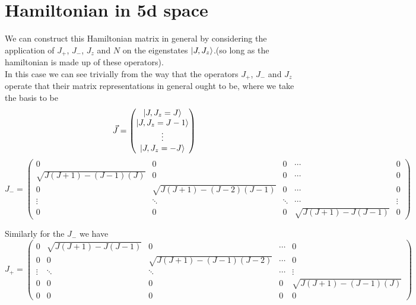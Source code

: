 \documentclass[11pt]{article} %
\begin{document}
\section{Hamiltonian in 5d space}

We can construct this Hamiltonian matrix in general by considering the application of $J_+$, $J_-$, $J_z$ and $N$ on the eigenstates $\ket{J,J_z}$.(so long as the hamiltonian is made up of these operators).\\


In this case we can see trivially from the way that the operators $J_+$, $J_-$ and $J_z$ operate that their matrix representations in general ought to be, where we take the basis to be \\
\begin{equation}
\vec{J}=\begin{pmatrix} \ket{J,J_z=J} \\ \ket{J,J_z=J-1} \\ \vdots \\ \ket{J,J_z=-J} \end{pmatrix}\end{equation}
\begin{equation}
J_-=\begin{pmatrix} 0 & 0 & 0 & \cdots & 0 \\
\sqrt{J(J+1)-(J-1)(J)} & 0 & 0 & \cdots & 0 \\
0& \sqrt{J(J+1)-(J-2)(J-1)}  & 0 & \cdots & 0 \\
\vdots & \ddots  & \ddots  & \cdots & \vdots\\
0 & 0 & 0 & \sqrt{J(J+1)-J(J-1)}& 0 

 \end{pmatrix}
\end{equation}  


Similarly for the $J_-$ we have\\

\begin{equation}
J_+=\begin{pmatrix} 0 & \sqrt{J(J+1)-J(J-1)} & 0 & \cdots & 0 \\
0 & 0 & \sqrt{J(J+1)-(J-1)(J-2)} & \cdots & 0 \\
\vdots & \ddots  & \ddots  & \cdots & \vdots\\
0 & 0 & 0 & 0 & \sqrt{J(J+1)-(J-1)(J)}\\
0 & 0 & 0 & 0& 0 

 \end{pmatrix}
\end{equation}  
\end{document}
